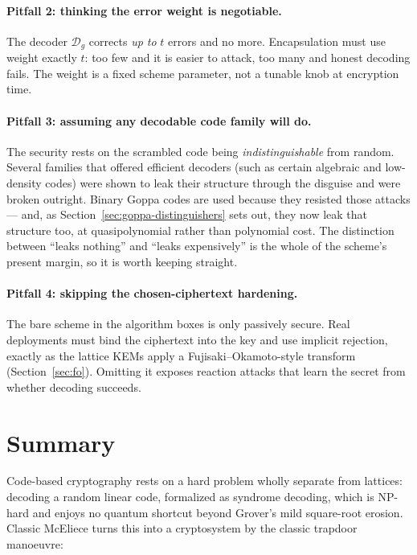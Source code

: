 \paragraph{Pitfall 2: thinking the error weight is negotiable.}
The decoder $\mathcal{D}_g$ corrects \emph{up to} $t$ errors and no more. Encapsulation must use weight exactly $t$: too few and it is easier to attack, too many and honest decoding fails. The weight is a fixed scheme parameter, not a tunable knob at encryption time.

\paragraph{Pitfall 3: assuming any decodable code family will do.}
The security rests on the scrambled code being \emph{indistinguishable} from random. Several families that offered efficient decoders (such as certain algebraic and low-density codes) were shown to leak their structure through the disguise and were broken outright. Binary Goppa codes are used because they resisted those attacks --- and, as Section~\ref{sec:goppa-distinguishers} sets out, they now leak that structure too, at quasipolynomial rather than polynomial cost. The distinction between ``leaks nothing'' and ``leaks expensively'' is the whole of the scheme's present margin, so it is worth keeping straight.

\paragraph{Pitfall 4: skipping the chosen-ciphertext hardening.}
The bare scheme in the algorithm boxes is only passively secure. Real deployments must bind the ciphertext into the key and use implicit rejection, exactly as the lattice KEMs apply a Fujisaki--Okamoto-style transform
(Section~\ref{sec:fo}). Omitting it exposes reaction attacks that learn the secret from whether decoding succeeds.

\section{Summary}

Code-based cryptography rests on a hard problem wholly separate from lattices: decoding a random linear code, formalized as syndrome decoding, which is NP-hard and enjoys no quantum shortcut beyond Grover's mild square-root erosion. Classic McEliece turns this into a cryptosystem by the classic trapdoor manoeuvre:

